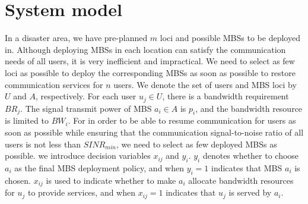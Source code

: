 \documentclass[11pt,a4paper]{article}
\begin{document}
\section{System model}
In a disaster area, we have pre-planned $m$ loci and possible MBSs to be deployed in. Although deploying MBSs in each location can satisfy the communication needs of all users, it is very inefficient and impractical. We need to select as few loci as possible to deploy the corresponding MBSs as soon as possible to restore communication services for $n$ users. We denote the set of users and MBS loci by $U$ and $A$, respectively. For each user $u_j \in U$, there is a bandwidth requirement $BR_j$. The signal transmit power of MBS $a_i \in A$ is $p_i$, and the bandwidth resource is limited to $BW_i$. For in order to be able to resume communication for users as soon as possible while ensuring that the communication signal-to-noise ratio of all users is not less than $SINR_{min}$, we need to select as few deployed MBSs as possible. we introduce decision variables $x_{ij}$ and $y_i$. $y_i$ denotes whether to choose $a_i$ as the final MBS deployment policy, and when $y_i=1$ indicates that MBS $a_i$ is chosen. $x_{ij}$ is used to indicate whether to make $a_i$ allocate bandwidth resources for $u_j$ to provide services, and when $x_{ij}=1$ indicates that $u_j$ is served by $a_i$.
\end{document}
